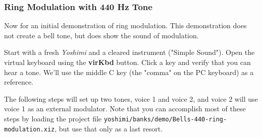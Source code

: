 \subsubsection{Ring Modulation with 440 Hz Tone}
\label{subsec:cookbook_instruments_ring_mod_440}

   Now for an initial demonstration of ring modulation.
   This demonstration does not create a bell tone, but does show
   the sound of modulation.

   Start with a fresh \textsl{Yoshimi} and a cleared instrument ("Simple
   Sound").  Open the virtual keyboard using the \textbf{virKbd} button.
   Click a key and verify that you can hear a tone.  We'll use the middle C
   key (the "comma" on the PC keyboard) as a reference.

   The following steps will set up two tones, voice 1 and voice 2, and voice
   2 will use voice 1 as an external modulator.
   Note that you can accomplish most of these steps by loading the project
   file \texttt{yoshimi/banks/demo/Bells-440-ring-modulation.xiz}, but use
   that only as a last resort.

